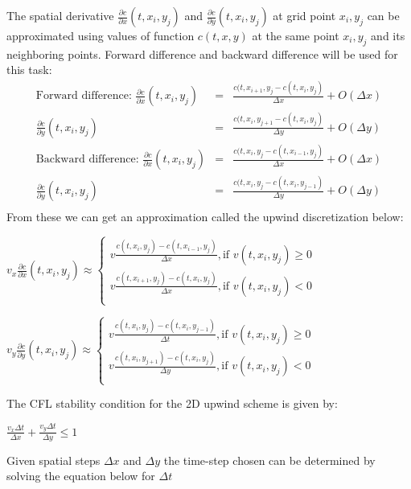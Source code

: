 \documentclass[12pt]{article}
\begin{document}
The spatial derivative $\frac{\partial c}{\partial x} (t,x_i, y_j)$ and $\frac{\partial c}{\partial y} (t,x_i, y_j)$ at grid point $x_i, y_j$ can be approximated using values of function $c(t,x,y)$ at the same point $x_i, y_j$ and its neighboring points.  Forward difference and backward difference will be used for this task:
\begin{eqnarray}
\textrm{Forward difference: } \frac{\partial c}{\partial x}(t,x_i,y_j) &=& \frac{c(t,x_{i+1},y_j-c(t,x_i,y_j)}{\Delta x} + O(\Delta x) \\\nonumber
\frac{\partial c}{\partial y}(t,x_i,y_j)&=&\frac{c(t,x_{i},y_{j+1}-c(t,x_i,y_j)}{\Delta y} + O(\Delta y) \\\nonumber
\textrm{Backward difference: } \frac{\partial c}{\partial x}(t,x_i,y_j) &=& \frac{c(t,x_{i},y_j-c(t,x_{i-1},y_j)}{\Delta x} + O(\Delta x) \\\nonumber
\frac{\partial c}{\partial y}(t,x_i,y_j)&=&\frac{c(t,x_{i},y_{j}-c(t,x_i,y_{j-1})}{\Delta y} + O(\Delta y) \\\nonumber
\end{eqnarray}
From these we can get an approximation called the upwind discretization below:
\begin{center}
$v_x\frac{\partial c}{\partial x}(t,x_i,y_j)\approx\begin{cases} 
v\frac{c(t,x_i,y_j)-c(t,x_{i-1},y_j)}{\Delta x}, \textrm{if }v(t,x_i,y_j) \geq 0 \\
v\frac{c(t,x_{i+1},y_j)-c(t,x_{i},y_j)}{\Delta x}, \textrm{if }v(t,x_i,y_j) < 0 \\
 \end{cases}
$
\end{center}
\begin{center}
$v_y\frac{\partial c}{\partial y}(t,x_i,y_j)\approx\begin{cases} 
v\frac{c(t,x_i,y_j)-c(t,x_{i},y_{j-1})}{\Delta t}, \textrm{if }v(t,x_i,y_j) \geq 0 \\
v\frac{c(t,x_{i},y_{j+1})-c(t,x_{i},y_j)}{\Delta y}, \textrm{if }v(t,x_i,y_j) < 0 \\
 \end{cases}
$
\end{center}
The CFL stability condition for the 2D upwind scheme is given by:
\begin{center}
$\frac{v_x \Delta t}{\Delta x}+ \frac{v_y \Delta t}{\Delta y} \leq 1$
\end{center}
Given spatial steps $\Delta x$ and $\Delta y$ the time-step chosen can be determined by solving the equation below for $\Delta t$
\end{document}
